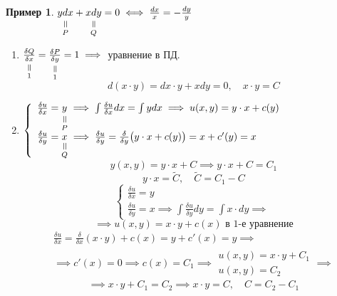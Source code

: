 \documentclass[11pt,a4paper,oneside]{report}
\newcommand{\verteq}[0]{\rotatebox{90}{$=$}}
\newcommand{\equalto}[2]{\underset{\scriptstyle\overset{\mkern4mu\verteq}{#2}}{#1}}
\theoremstyle{definition}
\newtheorem{example}{Пример}
\theoremstyle{plain}
\theoremstyle{remark}
\begin{document}
\begin{example}
    $\equalto{ydx}{P} + \equalto{xdy}{Q} = 0 \iff \frac{dx}{x} = - \frac{dy}{y}$
    \begin{enumerate}
        \item $\equalto{\frac{\delta Q}{\delta x}}{1} = \equalto{\frac{\delta P}{\delta y}}{1} = 1 \implies$ уравнение в ПД.
              \begin{equation*}
                  d(x\cdot y) = dx \cdot y + xdy = 0, \quad x \cdot y = C
              \end{equation*}
        \item $\left\{\begin{array}{l}
                      \frac{\delta u}{\delta x} = \equalto{y}{P} \implies \int\frac{\delta u}{\delta x}dx = \int ydx \implies u(x,y) = y\cdot x + c(y) \\
                      \frac{\delta u}{\delta y} = \equalto{x}{Q} \implies \frac{\delta u}{\delta y} = \frac{\delta}{\delta y}\big(y\cdot x + c(y)\big) = x + c'(y) = x
                  \end{array}\right.$
              \begin{equation*}
                  y(x,y) = y\cdot x + C \implies y \cdot x + C = C_1
              \end{equation*}
              \begin{equation*}
                  y \cdot x = \widetilde{C}, \quad \widetilde{C} = C_1 - C
              \end{equation*}
              \begin{equation*}
                  \left\{\begin{array}{l}
                      \frac{\delta u}{\delta x} = y \\
                      \frac{\delta u}{\delta y} = x \implies \int \frac{\delta u}{\delta y}dy = \int x \cdot dy \implies
                  \end{array}\right.
              \end{equation*}
              \begin{equation*}
                  \implies u(x,y) = x\cdot y + c(x)\text{ в 1-е уравнение}
              \end{equation*}
              \begin{multline*}
                  \frac{\delta u}{\delta x} = \frac{\delta}{\delta x}(x\cdot y) + c(x) = y + c'(x) = y \implies \\
                  \implies c'(x) = 0 \implies c(x) = C_1 \implies \begin{array}{l}
                      u(x,y) = x\cdot y + C_1 \\
                      u(x,y) = C_2
                  \end{array} \implies
              \end{multline*}
              \begin{equation*}
                  \implies x\cdot y + C_1 = C_2 \implies x\cdot y = C, \quad C = C_2 - C_1
              \end{equation*}
    \end{enumerate}
\end{example}
\end{document}
